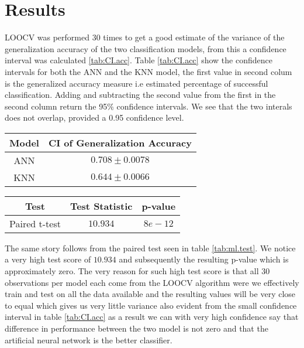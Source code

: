 \documentclass{article}
\begin{document}
\section{Results}
LOOCV was performed 30 times to get a good estimate of the variance of the generalization accuracy of the two classification models, from this a confidence interval was calculated \ref{tab:CI.acc}. Table \ref{tab:CI.acc} show the confidence intervals for both the ANN and the KNN model, the first value in second colum is the generalized accuracy measure i.e estimated percentage of successful classification. Adding and subtracting the second value from the first in the second column return the 95\% confidence intervals. We see that the two interals does not overlap, provided a 0.95 confidence level.

\begin{minipage}{\linewidth}
\centering
{} 
\begin{tabular}{ c c}\toprule[2pt]
\bf Model  & \bf CI of Generalization Accuracy \\\midrule[1.5pt]
ANN  & $0.708 \pm 0.0078$  \\\midrule
KNN  & $0.644 \pm 0.0066$ \\
\bottomrule[1.25pt]
\end {tabular}\par
\label{tab:CI.acc}
\end{minipage} \bigskip

\begin{minipage}{\linewidth}
	\centering
	\begin{tabular}{ c c c}\toprule[1.5pt]
	\bf Test  & \bf Test Statistic & \bf p-value \\\midrule[1.5pt]
	Paired t-test  & $10.934$ &  $8e-12$ \\
	\bottomrule[1.5pt]
	\end {tabular}\par
	\label{tab:ml.test}
\end{minipage} \bigskip

The same story follows from the paired test seen in table \ref{tab:ml.test}. We notice a very high test score of $10.934$ and subsequently the resulting p-value which is approximately zero. The very reason for such high test score is that all 30 observations per model each come from the LOOCV algorithm were we effectively train and test on all the data available and the resulting values will be very close to equal which gives us very little variance also evident from the small confidence interval in table \ref{tab:CI.acc} as a result we can with very high confidence say that difference in performance between the two model is not zero and that the artificial neural network is the better classifier.
\end{document}
